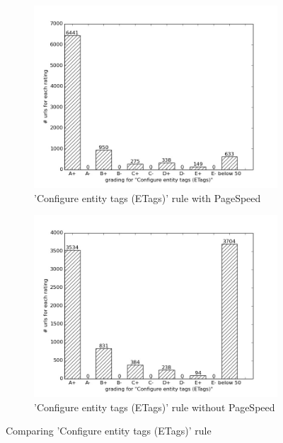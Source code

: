 \documentclass[conference]{IEEEtran}
\begin{document}
\begin{figure}
    \centering
    \begin{subfigure}[b]{\columnwidth}        %
        \centering
	\includegraphics[scale=0.33]{new-img-jpg/container-jpg/Configure entity tags (ETags).jpg}
        \caption{'Configure entity tags (ETags)' rule with PageSpeed}
        \label{fig:etag-pagespeed}
    \end{subfigure}
    \hfill
    \begin{subfigure}[b]{\columnwidth}        %
        \centering
	 \includegraphics[scale=0.33]{new-img-jpg/deploy-jpg/Configure entity tags (ETags).jpg}
        \caption{'Configure entity tags (ETags)' rule without PageSpeed}
        \label{fig:etag-nopagespeed}
    \end{subfigure}
    \caption{Comparing 'Configure entity tags (ETags)' rule}
    \label{fig:etag-comparison}
\end{figure}
\end{document}
